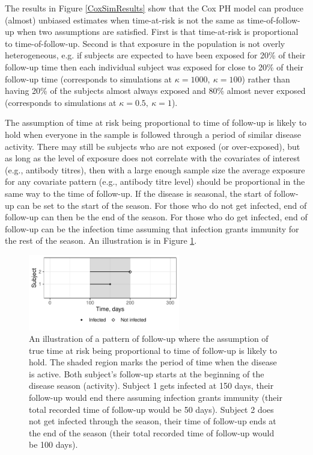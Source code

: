 The results in Figure \ref{CoxSimResults} show that the Cox PH model can produce (almost) unbiased estimates when time-at-risk is not the same as time-of-follow-up when two assumptions are satisfied. First is that time-at-risk is proportional to time-of-follow-up. Second is that exposure in the population is not overly heterogeneous, e.g. if subjects are expected to have been exposed for 20\% of their follow-up time then each individual subject was exposed for close to 20\% of their follow-up time (corresponds to simulations at $\kappa = 1000,\ \kappa = 100$) rather than having 20\% of the subjects almost always exposed and 80\% almost never exposed (corresponds to simulations at $\kappa = 0.5,\ \kappa = 1$).

The assumption of time at risk being proportional to time of follow-up is likely to hold when everyone in the sample is followed through a period of similar disease activity. There may still be subjects who are not exposed (or over-exposed), but as long as the level of exposure does not correlate with the covariates of interest (e.g., antibody titres), then with a large enough sample size the average exposure for any covariate pattern (e.g., antibody titre level) should be proportional in the same way to the time of follow-up. If the disease is seasonal, the start of follow-up can be set to the start of the season. For those who do not get infected, end of follow-up can then be the end of the season. For those who do get infected, end of follow-up can be the infection time assuming that infection grants immunity for the rest of the season. An illustration is in Figure \ref{CoxIdeal}.

\begin{figure}[htp]
	\centering
	\includegraphics[width=0.59\textwidth]{../curve-cox/timeplot_3_light.pdf}
	\caption{
	An illustration of a pattern of follow-up where the assumption of true time at risk being proportional to time of follow-up is likely to hold. The shaded region marks the period of time when the disease is active. Both subject's follow-up starts at the beginning of the disease season (activity). Subject 1 gets infected at 150 days, their follow-up would end there assuming infection grants immunity (their total recorded time of follow-up would be 50 days). Subject 2 does not get infected through the season, their time of follow-up ends at the end of the season (their total recorded time of follow-up would be 100 days).
	}
	\label{CoxIdeal}
\end{figure}

